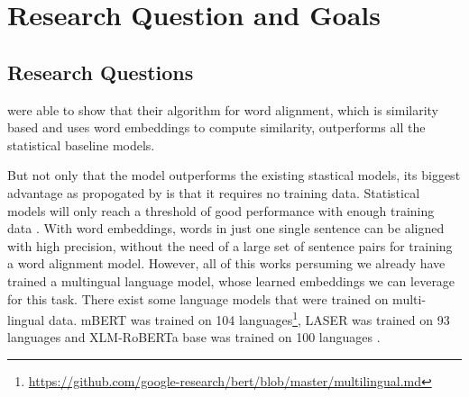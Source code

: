 


\section{Research Question and Goals}
\subsection{Research Questions}
\cite{jalili-sabet-etal-2020-simalign} were able to show that their algorithm for word alignment, which is similarity based and uses word embeddings to compute similarity, outperforms all the statistical baseline models. 

But not only that the model outperforms the existing stastical models, its biggest advantage as propogated by \cite{jalili-sabet-etal-2020-simalign} is that it requires no training data. 
Statistical models will only reach a threshold of good performance with enough training data \autocites{jalili-sabet-etal-2020-simalign,och-ney-2000-improved}. 
With word embeddings, words in just one single sentence can be aligned with high precision, without the need of a large set of sentence pairs for training a word alignment model.
However, all of this works persuming we already have trained a multingual language model, whose learned embeddings we can leverage for this task. 
There exist some language models that were trained on multi-lingual data. 
mBERT was trained on 104 languages\footnote{\url{https://github.com/google-research/bert/blob/master/multilingual.md}}, LASER was trained on 93 languages\autocite{artexte-schwenk-2019-laser} and XLM-RoBERTa base was trained on 100 languages \autocite{conneau-etal-2020-xlm}. 

